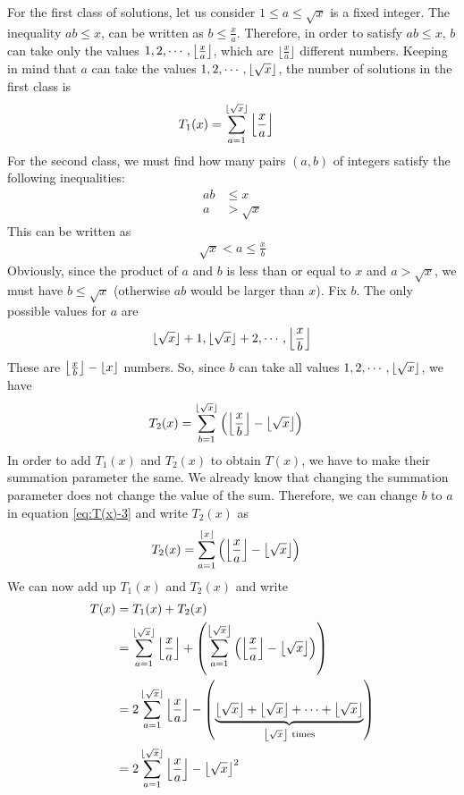 For the first class of solutions, let us consider $1 \leq a \leq \sqrt x$ is a fixed integer. The inequality $ab \leq x$, can be written as $b \leq \frac{x}{a}$. Therefore, in order to satisfy $ab \leq x$, $b$ can take only the values $1, 2,\cdots,\left\lfloor{\frac{x}{a}}\right\rfloor$, which are $\lfloor \frac{x}{a}\rfloor$ different numbers. Keeping in mind that $a$ can take the values $1, 2, \cdots, \left\lfloor{\sqrt{x}}\right\rfloor$, the number of solutions in the first class is
\begin{align*}
	T_1(x) &= \sum_{a=1}^{\lfloor\sqrt x\rfloor} \left\lfloor{\frac{x}{a}}\right\rfloor
\end{align*}
For the second class, we must find how many pairs $(a,b)$ of integers satisfy the following inequalities:
\begin{align*}
	ab
		& \leq x\\
	a
		& > \sqrt x
\end{align*}
This can be written as
\begin{align*}
	\sqrt x < a \leq \frac{x}{b}
\end{align*}
Obviously, since the product of $a$ and $b$ is less than or equal to $x$ and $a > \sqrt x$, we must have $b \leq \sqrt x$ (otherwise $ab$ would be larger than $x$). Fix $b$. The only possible values for $a$ are
\begin{align*}
	\lfloor \sqrt x \rfloor +1, \lfloor \sqrt x \rfloor +2, \cdots,\left\lfloor{\frac{x}{b}}\right\rfloor
\end{align*}
These are $\left\lfloor{\frac{x}{b}}\right\rfloor- \left\lfloor{x}\right\rfloor$ numbers. So, since $b$ can take all values $1, 2, \cdots,\left\lfloor{\sqrt{x}}\right\rfloor$, we have
\begin{align}
	T_2(x) &= \sum_{b=1}^{\lfloor\sqrt x\rfloor}\left(\left\lfloor{\frac{x}{b}}\right\rfloor-\left\lfloor{\sqrt{x}}\right\rfloor\right) \label{eq:T(x)-3}
\end{align}
In order to add $T_1(x)$ and $T_2(x)$ to obtain $T(x)$, we have to make their summation parameter the same. We already know that changing the summation parameter does not change the value of the sum. Therefore, we can change $b$ to $a$ in equation \ref{eq:T(x)-3} and write $T_2(x)$ as
\begin{align*}
	T_2(x) &= \sum_{a=1}^{\left\lfloor{x}\right\rfloor}\left(\left\lfloor{\frac{x}{a}}\right\rfloor-\left\lfloor{\sqrt{x}}\right\rfloor\right)
\end{align*}
We can now add up $T_1(x)$ and $T_2(x)$ and write
\begin{align*}
	T(x) & =  T_1(x) + T_2(x)\\
	 & = \sum_{a=1}^{\lfloor\sqrt x\rfloor} \left\lfloor{\frac{x}{a}}\right\rfloor+\left(\sum_{a=1}^{\left\lfloor{\sqrt{x}}\right\rfloor}\left(\left\lfloor{\frac{x}{a}}\right\rfloor-\left\lfloor{\sqrt{x}}\right\rfloor\right)\right)\\
	 & = 2\sum_{a=1}^{\lfloor\sqrt x\rfloor}\left\lfloor{\frac{x}{a}}\right\rfloor- \left(\underbrace{\left\lfloor{\sqrt{x}}\right\rfloor+\left\lfloor{\sqrt{x}}\right\rfloor+ \cdots +\left\lfloor{\sqrt{x}}\right\rfloor}_{\left\lfloor{\sqrt{x}}\right\rfloor\text{ times}}\right)\\
   & = 2\sum_{a=1}^{\lfloor\sqrt x\rfloor}\left\lfloor{\frac{x}{a}}\right\rfloor- \left\lfloor{\sqrt{x}}\right\rfloor^2
\end{align*}
